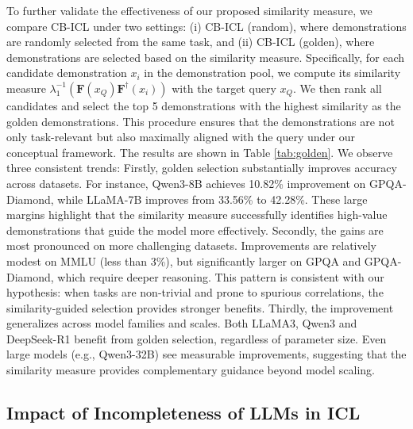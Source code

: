 \documentclass{article} %
\theoremstyle{plain} %
\begin{document}
To further validate the effectiveness of our proposed similarity measure, we compare CB-ICL under two settings: (i) CB-ICL (random), where demonstrations are randomly selected from the same task, and (ii) CB-ICL (golden), where demonstrations are selected based on the similarity measure. Specifically, for each candidate demonstration $x_i$ in the demonstration pool, we compute its similarity measure $\lambda_1^{-1}(\mathbf{F}(x_Q)\mathbf{F}^\dagger(x_i))$ with the target query $x_Q$. We then rank all candidates and select the top 5 demonstrations with the highest similarity as the golden demonstrations. This procedure ensures that the demonstrations are not only task-relevant but also maximally aligned with the query under our conceptual framework. The results are shown in Table \ref{tab:golden}. We observe three consistent trends: Firstly, golden selection substantially improves accuracy across datasets. For instance, Qwen3-8B achieves 10.82\% improvement on GPQA-Diamond, while LLaMA-7B improves from 33.56\% to 42.28\%. These large margins highlight that the similarity measure successfully identifies high-value demonstrations that guide the model more effectively. Secondly, the gains are most pronounced on more challenging datasets. Improvements are relatively modest on MMLU (less than 3\%), but significantly larger on GPQA and GPQA-Diamond, which require deeper reasoning. This pattern is consistent with our hypothesis: when tasks are non-trivial and prone to spurious correlations, the similarity-guided selection provides stronger benefits. Thirdly, the improvement generalizes across model families and scales. Both LLaMA3, Qwen3 and DeepSeek-R1 benefit from golden selection, regardless of parameter size. Even large models (e.g., Qwen3-32B) see measurable improvements, suggesting that the similarity measure provides complementary guidance beyond model scaling.

\subsection{Impact of Incompleteness of LLMs in ICL}
\end{document}
